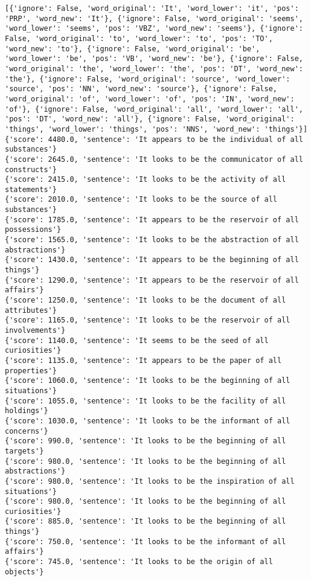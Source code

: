 \documentclass[12pt,a4paper,oneside]{book}
\begin{document}
\begin{verbatim}
[{'ignore': False, 'word_original': 'It', 'word_lower': 'it', 'pos': 'PRP', 'word_new': 'It'}, {'ignore': False, 'word_original': 'seems', 'word_lower': 'seems', 'pos': 'VBZ', 'word_new': 'seems'}, {'ignore': False, 'word_original': 'to', 'word_lower': 'to', 'pos': 'TO', 'word_new': 'to'}, {'ignore': False, 'word_original': 'be', 'word_lower': 'be', 'pos': 'VB', 'word_new': 'be'}, {'ignore': False, 'word_original': 'the', 'word_lower': 'the', 'pos': 'DT', 'word_new': 'the'}, {'ignore': False, 'word_original': 'source', 'word_lower': 'source', 'pos': 'NN', 'word_new': 'source'}, {'ignore': False, 'word_original': 'of', 'word_lower': 'of', 'pos': 'IN', 'word_new': 'of'}, {'ignore': False, 'word_original': 'all', 'word_lower': 'all', 'pos': 'DT', 'word_new': 'all'}, {'ignore': False, 'word_original': 'things', 'word_lower': 'things', 'pos': 'NNS', 'word_new': 'things'}]
{'score': 4480.0, 'sentence': 'It appears to be the individual of all substances'}
{'score': 2645.0, 'sentence': 'It looks to be the communicator of all constructs'}
{'score': 2415.0, 'sentence': 'It looks to be the activity of all statements'}
{'score': 2010.0, 'sentence': 'It looks to be the source of all substances'}
{'score': 1785.0, 'sentence': 'It appears to be the reservoir of all possessions'}
{'score': 1565.0, 'sentence': 'It looks to be the abstraction of all abstractions'}
{'score': 1430.0, 'sentence': 'It appears to be the beginning of all things'}
{'score': 1290.0, 'sentence': 'It appears to be the reservoir of all affairs'}
{'score': 1250.0, 'sentence': 'It looks to be the document of all attributes'}
{'score': 1165.0, 'sentence': 'It looks to be the reservoir of all involvements'}
{'score': 1140.0, 'sentence': 'It seems to be the seed of all curiosities'}
{'score': 1135.0, 'sentence': 'It appears to be the paper of all properties'}
{'score': 1060.0, 'sentence': 'It looks to be the beginning of all situations'}
{'score': 1055.0, 'sentence': 'It looks to be the facility of all holdings'}
{'score': 1030.0, 'sentence': 'It looks to be the informant of all concerns'}
{'score': 990.0, 'sentence': 'It looks to be the beginning of all targets'}
{'score': 980.0, 'sentence': 'It looks to be the beginning of all abstractions'}
{'score': 980.0, 'sentence': 'It looks to be the inspiration of all situations'}
{'score': 980.0, 'sentence': 'It looks to be the beginning of all curiosities'}
{'score': 885.0, 'sentence': 'It looks to be the beginning of all things'}
{'score': 750.0, 'sentence': 'It looks to be the informant of all affairs'}
{'score': 745.0, 'sentence': 'It looks to be the origin of all objects'}

\end{verbatim}
\end{document}
